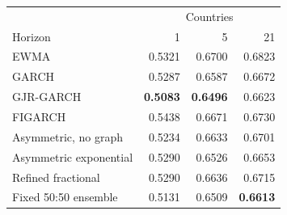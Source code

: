 \begin{tabular}{lrrr}
\toprule
 & \multicolumn{3}{c}{Countries} \\
Horizon & 1 & 5 & 21 \\
\midrule
EWMA & 0.5321 & 0.6700 & 0.6823 \\
GARCH & 0.5287 & 0.6587 & 0.6672 \\
GJR-GARCH & \textbf{0.5083} & \textbf{0.6496} & 0.6623 \\
FIGARCH & 0.5438 & 0.6671 & 0.6730 \\
Asymmetric, no graph & 0.5234 & 0.6633 & 0.6701 \\
Asymmetric exponential & 0.5290 & 0.6526 & 0.6653 \\
Refined fractional & 0.5290 & 0.6636 & 0.6715 \\
Fixed 50:50 ensemble & 0.5131 & 0.6509 & \textbf{0.6613} \\
\bottomrule
\end{tabular}
